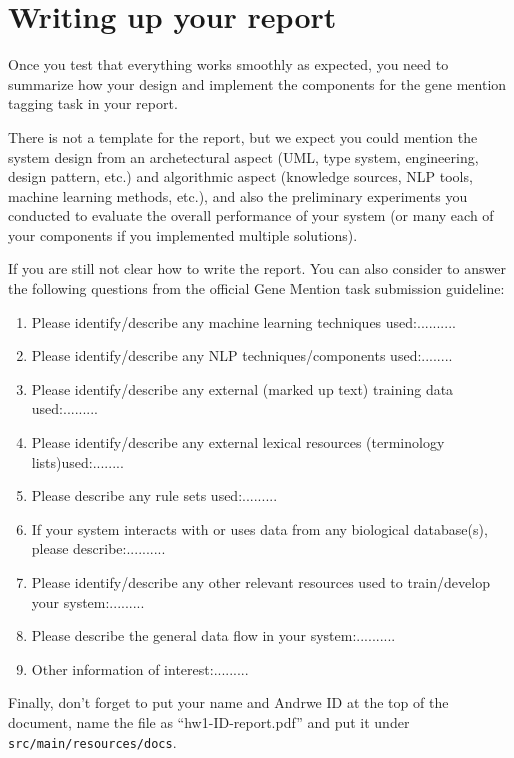 
\section{Writing up your report}

Once you test that everything works smoothly as expected, you need to summarize
how your design and implement the components for the gene mention tagging task
in your report.

There is not a template for the report, but we expect you could mention the
system design from an archetectural aspect (UML, type system, engineering,
design pattern, etc.) and algorithmic aspect (knowledge sources, NLP tools,
machine learning methods, etc.), and also the preliminary experiments you
conducted to evaluate the overall performance of your system (or many each of
your components if you implemented multiple solutions).

If you are still not clear how to write the report. You can also consider to
answer the following questions from the official Gene Mention task submission
guideline:

\begin{enumerate}
\item Please identify/describe any machine learning techniques used:.......... 
\item Please identify/describe any NLP techniques/components used:........ 
\item Please identify/describe any external (marked up text) training data used:......... 
\item Please identify/describe any external lexical resources (terminology lists)used:........ 
\item Please describe any rule sets used:......... 
\item If your system interacts with or uses data from any biological database(s), please describe:.......... 
\item Please identify/describe any other relevant resources used to train/develop your system:......... 
\item Please describe the general data flow in your system:.......... 
\item Other information of interest:.........
\end{enumerate}

Finally, don't forget to put your name and Andrwe ID at the top of the document,
name the file as ``hw1-ID-report.pdf'' and put it under
\texttt{src/main/resources/docs}.
